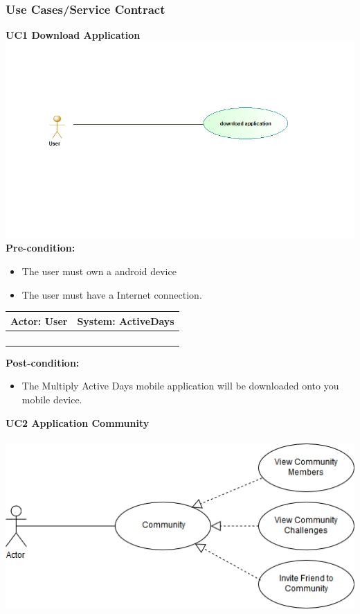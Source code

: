 \documentclass[11pt]{article}
\begin{document}
\subsubsection{Use Cases/Service Contract}
\textbf{UC1 Download Application}\\
\includegraphics[scale=0.5]{./DiagramsTshepo/downloadApp.png}\\
\textbf{Pre-condition: }   \\
\begin{itemize}
	\item The user must own a android device
	\item The user must have a Internet connection.
\end{itemize}
\begin{center}
	\begin{tabular}{ |p{8cm}|p{8cm}| }
		\hline
		\textbf{Actor:} User & \textbf{System:} ActiveDays \\
		\hline
		  &  \\
		\hline
		 &  \\
		\hline
		 & \\   
		\hline
		  & \\
		\hline
	\end{tabular}
\end{center}		
\textbf{Post-condition: } \\
\begin{itemize}
	\item The Multiply Active Days mobile application will be downloaded onto you mobile device.
\end{itemize}	
\textbf{UC2 Application Community}\\\\
\includegraphics[scale=0.5]{./DiagramsAzhar/Community1.png}\\\\
\end{document}
